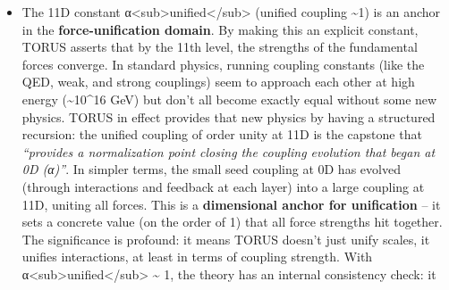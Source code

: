 \documentclass[
]{article}
\begin{document}
\begin{itemize}
  time (1D) and pump in the quantum of action (5D) and convert it to
  thermal energy (6D), we indeed get on the order of 10\^{}32
  K\hspace{0pt}. It's remarkable that combining fundamental constants
  from much lower dimensions
  (t\textless sub\textgreater P\textless/sub\textgreater, h,
  k\textless sub\textgreater B\textless/sub\textgreater) naturally
  yields this Planck temperature -- it shows the \textbf{harmonic
  alignment} of scales: the highest temperature in nature emerges from
  the foundational constants set at the beginning of the
  cycle\hspace{0pt}file-7xdkvhtkz7nra1yajocm9w. In TORUS,
  \emph{T\textless sub\textgreater P\textless/sub\textgreater{}} is the
  anchor for the unification energy scale. It signals the point at which
  forces like the electromagnetic and nuclear forces would unify with
  gravity (in conventional terms, near the Grand Unification / Planck
  energy). Thus, 10D marks a pivotal anchor: push the universe to this
  temperature, and you are effectively at the brink of a new ``Big
  Bang'' where the next steps of the cycle (11D, 12D, 13D) come into
  play.
\item
  The 11D constant
  α\textless sub\textgreater unified\textless/sub\textgreater{} (unified
  coupling \textasciitilde1) is an anchor in the
  \textbf{force-unification domain}. By making this an explicit
  constant, TORUS asserts that by the 11th level, the strengths of the
  fundamental forces converge. In standard physics, running coupling
  constants (like the QED, weak, and strong couplings) seem to approach
  each other at high energy (\textasciitilde10\^{}16 GeV) but don't all
  become exactly equal without some new physics. TORUS in effect
  provides that new physics by having a structured recursion: the
  unified coupling of order unity at 11D is the capstone that
  \emph{``provides a normalization point closing the coupling evolution
  that began at 0D (α)''}\hspace{0pt}. In simpler terms, the small seed
  coupling at 0D has evolved (through interactions and feedback at each
  layer) into a large coupling at 11D, uniting all forces. This is a
  \textbf{dimensional anchor for unification} -- it sets a concrete
  value (on the order of 1) that all force strengths hit together. The
  significance is profound: it means TORUS doesn't just unify scales, it
  unifies interactions, at least in terms of coupling strength. With
  α\textless sub\textgreater unified\textless/sub\textgreater{}
  \textasciitilde{} 1, the theory has an internal consistency check: it

\end{itemize}
\end{document}
